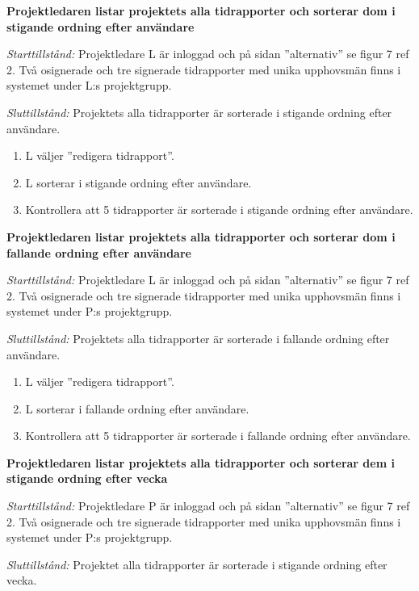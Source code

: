 \documentclass[a4paper]{article}
\begin{document}
\begin{FT}
\item %
\textbf{Projektledaren listar projektets alla tidrapporter och sorterar dom i stigande ordning efter användare}

\emph{Starttillstånd:} Projektledare L är inloggad och på sidan ''alternativ'' se figur 7 ref 2. Två osignerade och tre signerade tidrapporter med unika upphovsmän finns i systemet under L:s projektgrupp.

\emph{Sluttillstånd:} Projektets alla tidrapporter är sorterade i stigande ordning efter användare.

\begin{enumerate}
\item L väljer ''redigera tidrapport''.
\item L sorterar i stigande ordning efter användare.
\item Kontrollera att 5 tidrapporter är sorterade i stigande ordning efter användare.
\end{enumerate}

\item %
\textbf{Projektledaren listar projektets alla tidrapporter och sorterar dom i fallande ordning efter användare}

\emph{Starttillstånd:} Projektledare L är inloggad och på sidan ''alternativ'' se figur 7 ref 2. Två osignerade och tre signerade tidrapporter med unika upphovsmän finns i systemet under P:s projektgrupp.

\emph{Sluttillstånd:} Projektets alla tidrapporter är sorterade i fallande ordning efter användare.

\begin{enumerate}
\item L väljer ''redigera tidrapport''.
\item L sorterar i fallande ordning efter användare.
\item Kontrollera att 5 tidrapporter är sorterade i fallande ordning efter användare.
\end{enumerate}

\item %
\textbf{Projektledaren listar projektets alla tidrapporter och sorterar dem i stigande ordning efter vecka}

\emph{Starttillstånd:} Projektledare P är inloggad och på sidan ''alternativ'' se figur 7 ref 2. Två osignerade och tre signerade tidrapporter med unika upphovsmän finns i systemet under P:s projektgrupp.

\emph{Sluttillstånd:} Projektet alla tidrapporter är sorterade i stigande ordning efter vecka.


\end{FT}
\end{document}

